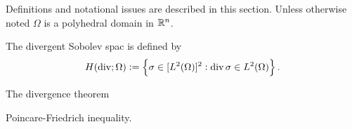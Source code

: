 \documentclass[thesis.tex]{subfiles}
\begin{document}
Definitions and notational issues are described in this section. Unless otherwise noted $\Omega$ is a polyhedral domain in $\mathbb{R}^n$.
\begin{defn}
  \label{def:hdiv}
The divergent Sobolev spac is defined by
\[
  H(\operatorname{div}; \Omega) := \set{ \sigma \in [L^2(\Omega)]^2 : \operatorname{div}\sigma \in L^2(\Omega)}.
  \]
\end{defn}

\begin{thm}
  \label{thm:divergence}
The divergence theorem
\end{thm}
\begin{thm}
  \label{thm:poincare}
  Poincare-Friedrich inequality.
\end{thm}
\end{document}
